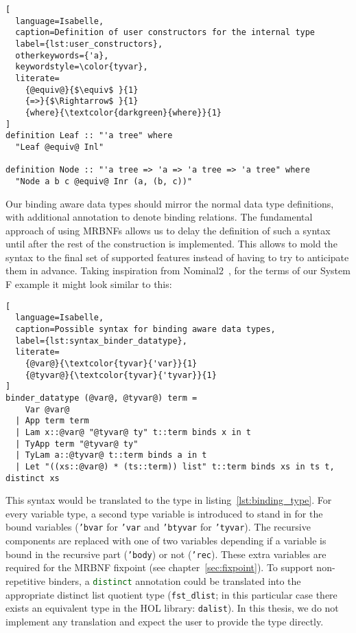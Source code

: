 \begin{minipage}{\textwidth}
\begin{lstlisting}[
  language=Isabelle,
  caption=Definition of user constructors for the internal type
  label={lst:user_constructors},
  otherkeywords={'a},
  keywordstyle=\color{tyvar},
  literate=
    {@equiv@}{$\equiv$ }{1}
    {=>}{$\Rightarrow$ }{1}
    {where}{\textcolor{darkgreen}{where}}{1}
]
definition Leaf :: "'a tree" where
  "Leaf @equiv@ Inl"

definition Node :: "'a tree => 'a => 'a tree => 'a tree" where
  "Node a b c @equiv@ Inr (a, (b, c))"
\end{lstlisting}
\end{minipage}

Our binding aware data types should mirror the normal data type definitions, with additional annotation to denote binding relations. The fundamental approach of using \acp{MRBNF} allows us to delay the definition of such a syntax until after the rest of the construction is implemented. This allows to mold the syntax to the final set of supported features instead of having to try to anticipate them in advance. Taking inspiration from Nominal2~\cite{nominal2}, for the terms of our System F example it might look similar to this:

\begin{lstlisting}[
  language=Isabelle,
  caption=Possible syntax for binding aware data types,
  label={lst:syntax_binder_datatype},
  literate=
    {@var@}{\textcolor{tyvar}{'var}}{1}
    {@tyvar@}{\textcolor{tyvar}{'tyvar}}{1}
]
binder_datatype (@var@, @tyvar@) term =
    Var @var@
  | App term term
  | Lam x::@var@ "@tyvar@ ty" t::term binds x in t
  | TyApp term "@tyvar@ ty"
  | TyLam a::@tyvar@ t::term binds a in t
  | Let "((xs::@var@) * (ts::term)) list" t::term binds xs in ts t, distinct xs
\end{lstlisting}

This syntax would be translated to the type in listing~\ref{lst:binding_type}. For every variable type, a second type variable is introduced to stand in for the bound variables (\texttt{\textcolor{tyvar}{'bvar}} for \texttt{\textcolor{tyvar}{'var}} and \texttt{\textcolor{tyvar}{'btyvar}} for \texttt{\textcolor{tyvar}{'tyvar}}). The recursive components are replaced with one of two variables depending if a variable is bound in the recursive part (\texttt{\textcolor{tyvar}{'body}}) or not (\texttt{\textcolor{tyvar}{'rec}}). These extra variables are required for the \ac{MRBNF} fixpoint (see chapter~\ref{sec:fixpoint}). To support non-repetitive binders, a \texttt{\textcolor{darkgreen}{distinct}} annotation could be translated into the appropriate distinct list quotient type (\texttt{fst\_dlist}; in this particular case there exists an equivalent type in the \ac{HOL} library: \texttt{dalist}). In this thesis, we do not implement any translation and expect the user to provide the type directly.

